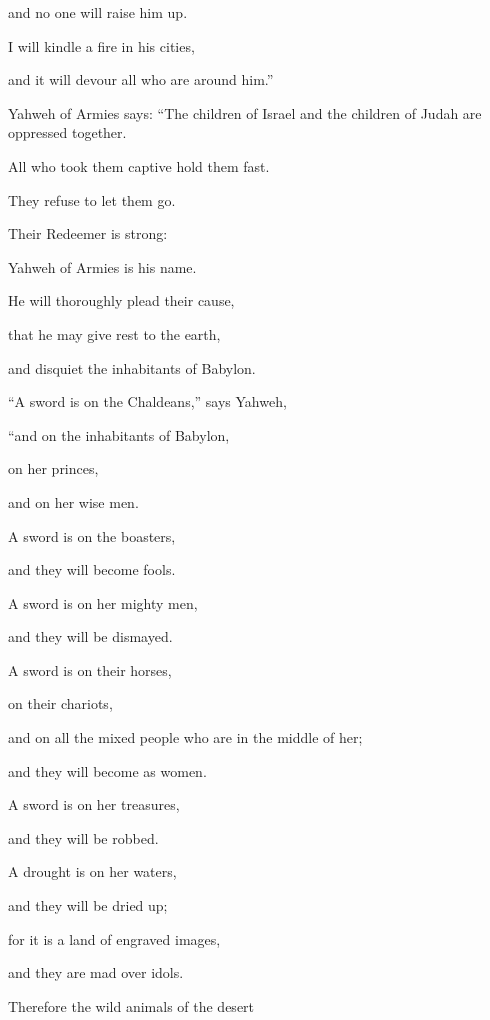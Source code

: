 {\par }{\QB and no one will raise him up.
\par }{\Q I will kindle a fire in his cities,
\par }{\QB and it will devour all who are around him.”
\par }{\Q {}Yahweh of Armies says: “The children of Israel and the children of Judah are oppressed together.
\par }{\QB All who took them captive hold them fast.
\par }{\QB They refuse to let them go.
\par }{\Q {}Their Redeemer is strong:
\par }{\QB Yahweh of Armies is his name.
\par }{\Q He will thoroughly plead their cause,
\par }{\QB that he may give rest to the earth,
\par }{\QB and disquiet the inhabitants of Babylon.
\par }{\BB \par }{\Q {}“A sword is on the Chaldeans,” says Yahweh,
\par }{\QB “and on the inhabitants of Babylon,
\par }{\QB on her princes,
\par }{\QB and on her wise men.
\par }{\Q {}A sword is on the boasters,
\par }{\QB and they will become fools.
\par }{\Q A sword is on her mighty men,
\par }{\QB and they will be dismayed.
\par }{\Q {}A sword is on their horses,
\par }{\QB on their chariots,
\par }{\QB and on all the mixed people who are in the middle of her;
\par }{\QB and they will become as women.
\par }{\Q A sword is on her treasures,
\par }{\QB and they will be robbed.
\par }{\Q {}A drought is on her waters,
\par }{\QB and they will be dried up;
\par }{\Q for it is a land of engraved images,
\par }{\QB and they are mad over idols.
\par }{\Q {}Therefore the wild animals of the desert
}
